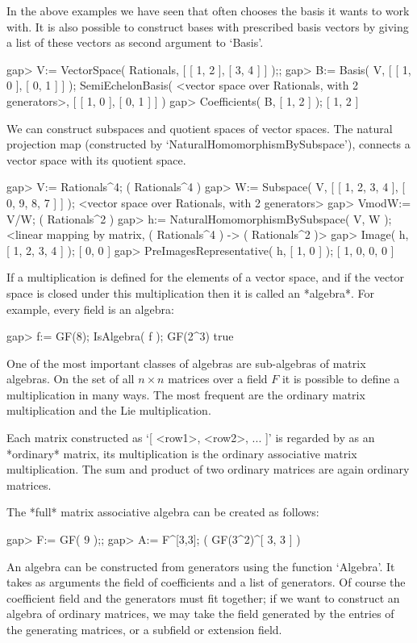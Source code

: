In the above examples we have seen that {\GAP} often chooses the basis
it wants to work with. It is also possible to construct bases with
prescribed basis vectors by giving a list of these vectors as second argument 
to `Basis'.

\beginexample
gap> V:= VectorSpace( Rationals, [ [ 1, 2 ], [ 3, 4 ] ] );; 
gap> B:= Basis( V, [ [ 1, 0 ], [ 0, 1 ] ] );
SemiEchelonBasis( <vector space over Rationals, with 2 generators>, 
[ [ 1, 0 ], [ 0, 1 ] ] )
gap> Coefficients( B, [ 1, 2 ] );
[ 1, 2 ]
\endexample

We can construct subspaces and quotient spaces of vector spaces. The
natural projection map (constructed by `NaturalHomomorphismBySubspace'),
connects a vector space with its quotient space.

\beginexample
gap> V:= Rationals^4;
( Rationals^4 )
gap> W:= Subspace( V, [ [ 1, 2, 3, 4 ], [ 0, 9, 8, 7 ] ] );
<vector space over Rationals, with 2 generators>
gap> VmodW:= V/W;
( Rationals^2 )
gap> h:= NaturalHomomorphismBySubspace( V, W );
<linear mapping by matrix, ( Rationals^4 ) -> ( Rationals^2 )>
gap> Image( h, [ 1, 2, 3, 4 ] );
[ 0, 0 ]
gap> PreImagesRepresentative( h, [ 1, 0 ] );
[ 1, 0, 0, 0 ]
\endexample



If a multiplication is defined for the elements of a vector space,
and if the vector space is closed under this multiplication then it is
called an *algebra*. For example, every field is an algebra:

\beginexample
gap> f:= GF(8); IsAlgebra( f );
GF(2^3)
true
\endexample

One of the most important classes of algebras are sub-algebras of matrix
algebras. On the set of all $n\times n$ matrices over a field $F$ 
it is possible to define a multiplication in many ways.
The most frequent are the ordinary matrix multiplication and the Lie
multiplication.

Each matrix constructed as `[ <row1>, <row2>, ... ]' is regarded by {\GAP}
as an *ordinary* matrix, its multiplication is the ordinary associative
matrix multiplication.
The sum and product of two ordinary matrices are again ordinary matrices.

The *full* matrix associative algebra can be created as follows:

\beginexample
gap> F:= GF( 9 );;
gap> A:= F^[3,3];
( GF(3^2)^[ 3, 3 ] )
\endexample

An algebra can be constructed from generators using the function `Algebra'.
It takes as arguments the field of coefficients and a list of generators.
Of course the coefficient field and the generators must fit together;
if we want to construct an algebra of ordinary matrices,
we may take the field generated by the entries of the generating matrices,
or a subfield or extension field.

